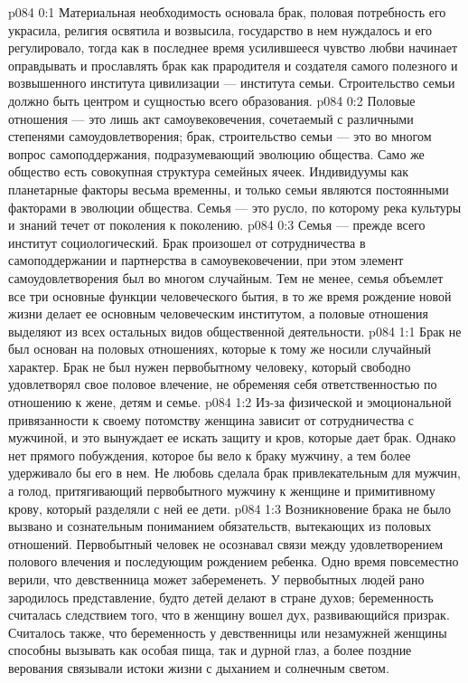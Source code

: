 \author{Глава Серафимов}
\vs p084 0:1 Материальная необходимость основала брак, половая потребность его украсила, религия освятила и возвысила, государство в нем нуждалось и его регулировало, тогда как в последнее время усилившееся чувство любви начинает оправдывать и прославлять брак как прародителя и создателя самого полезного и возвышенного института цивилизации --- института семьи. Строительство семьи должно быть центром и сущностью всего образования.
\vs p084 0:2 Половые отношения --- это лишь акт самоувековечения, сочетаемый с различными степенями самоудовлетворения; брак, строительство семьи --- это во многом вопрос самоподдержания, подразумевающий эволюцию общества. Само же общество есть совокупная структура семейных ячеек. Индивидуумы как планетарные факторы весьма временны, и только семьи являются постоянными факторами в эволюции общества. Семья --- это русло, по которому река культуры и знаний течет от поколения к поколению.
\vs p084 0:3 Семья --- прежде всего институт социологический. Брак произошел от сотрудничества в самоподдержании и партнерства в самоувековечении, при этом элемент самоудовлетворения был во многом случайным. Тем не менее, семья объемлет все три основные функции человеческого бытия, в то же время рождение новой жизни делает ее основным человеческим институтом, а половые отношения выделяют из всех остальных видов общественной деятельности.
\vs p084 1:1 Брак не был основан на половых отношениях, которые к тому же носили случайный характер. Брак не был нужен первобытному человеку, который свободно удовлетворял свое половое влечение, не обременяя себя ответственностью по отношению к жене, детям и семье.
\vs p084 1:2 Из\hyp{}за физической и эмоциональной привязанности к своему потомству женщина зависит от сотрудничества с мужчиной, и это вынуждает ее искать защиту и кров, которые дает брак. Однако нет прямого побуждения, которое бы вело к браку мужчину, а тем более удерживало бы его в нем. Не любовь сделала брак привлекательным для мужчин, а голод, притягивающий первобытного мужчину к женщине и примитивному крову, который разделяли с ней ее дети.
\vs p084 1:3 \pc Возникновение брака не было вызвано и сознательным пониманием обязательств, вытекающих из половых отношений. Первобытный человек не осознавал связи между удовлетворением полового влечения и последующим рождением ребенка. Одно время повсеместно верили, что девственница может забеременеть. У первобытных людей рано зародилось представление, будто детей делают в стране духов; беременность считалась следствием того, что в женщину вошел дух, развивающийся призрак. Считалось также, что беременность у девственницы или незамужней женщины способны вызывать как особая пища, так и дурной глаз, а более поздние верования связывали истоки жизни с дыханием и солнечным светом.
